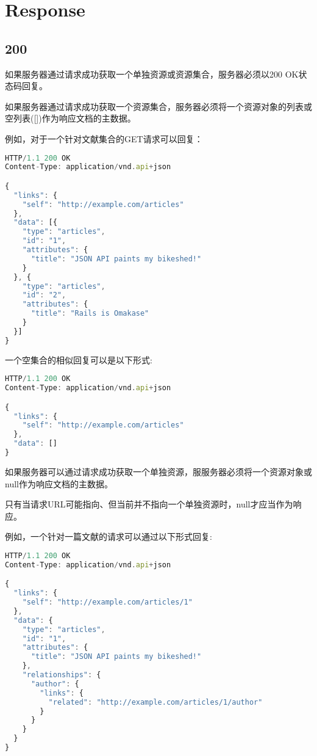 \section{Response}

\subsection{200}

如果服务器通过请求成功获取一个单独资源或资源集合，服务器必须以200 OK状态码回复。

如果服务器通过请求成功获取一个资源集合，服务器必须将一个资源对象的列表或空列表([])作为响应文档的主数据。

例如，对于一个针对文献集合的GET请求可以回复：



\begin{lstlisting}[language=JavaScript]
HTTP/1.1 200 OK
Content-Type: application/vnd.api+json

{
  "links": {
    "self": "http://example.com/articles"
  },
  "data": [{
    "type": "articles",
    "id": "1",
    "attributes": {
      "title": "JSON API paints my bikeshed!"
    }
  }, {
    "type": "articles",
    "id": "2",
    "attributes": {
      "title": "Rails is Omakase"
    }
  }]
}
\end{lstlisting}


一个空集合的相似回复可以是以下形式:

\begin{lstlisting}[language=JavaScript]
HTTP/1.1 200 OK
Content-Type: application/vnd.api+json

{
  "links": {
    "self": "http://example.com/articles"
  },
  "data": []
}
\end{lstlisting}

如果服务器可以通过请求成功获取一个单独资源，服服务器必须将一个资源对象或null作为响应文档的主数据。

只有当请求URL可能指向、但当前并不指向一个单独资源时，null才应当作为响应。

例如，一个针对一篇文献的请求可以通过以下形式回复:


\begin{lstlisting}[language=JavaScript]
HTTP/1.1 200 OK
Content-Type: application/vnd.api+json

{
  "links": {
    "self": "http://example.com/articles/1"
  },
  "data": {
    "type": "articles",
    "id": "1",
    "attributes": {
      "title": "JSON API paints my bikeshed!"
    },
    "relationships": {
      "author": {
        "links": {
          "related": "http://example.com/articles/1/author"
        }
      }
    }
  }
}
\end{lstlisting}


